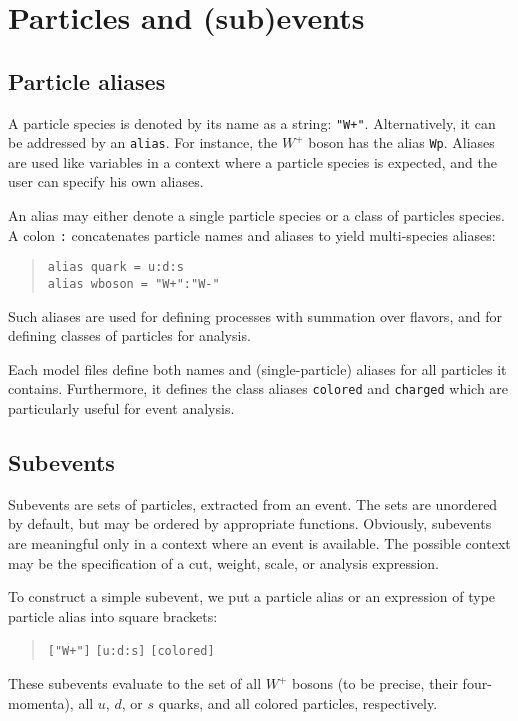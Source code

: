 \documentclass[12pt]{book}
\newcommand{\ttt}[1]{\texttt{#1}}
\begin{document}
\section{Particles and (sub)events}

\subsection{Particle aliases}
\label{sec:alias}

A particle species is denoted by its name as a string: \verb|"W+"|.
Alternatively, it can be addressed by an \ttt{alias}.  For instance, the $W^+$
boson has the alias \ttt{Wp}.  Aliases are used like variables in a context
where a particle species is expected, and the user can specify his own
aliases.

An alias may either denote a single particle species or a class of particles
species.  A colon \ttt{:} concatenates particle names and aliases to yield
multi-species aliases:
\begin{quote}
\begin{footnotesize}
\begin{verbatim}
alias quark = u:d:s
alias wboson = "W+":"W-"
\end{verbatim}
\end{footnotesize}
\end{quote}
Such aliases are used for defining processes with summation over flavors, and
for defining classes of particles for analysis.

Each model files define both names and (single-particle) aliases for all
particles it contains.  Furthermore, it defines the class aliases
\verb|colored| and \verb|charged| which are particularly useful for event
analysis.


\subsection{Subevents}

Subevents are sets of particles, extracted from an event.  The sets are
unordered by default, but may be ordered by appropriate functions.  Obviously,
subevents are meaningful only in a context where an event is available.  The
possible context may be the specification of a cut, weight, scale, or analysis
expression.

To construct a simple subevent, we put a particle alias or an expression of
type particle alias into square brackets:
\begin{quote}
\begin{footnotesize}
  \verb|["W+"]|\quad
  \verb|[u:d:s]|\quad
  \verb|[colored]|
\end{footnotesize}
\end{quote}
These subevents evaluate to the set of all $W^+$ bosons (to be precise, their
four-momenta), all $u$, $d$, or $s$ quarks, and all colored particles,
respectively.
\end{document}
